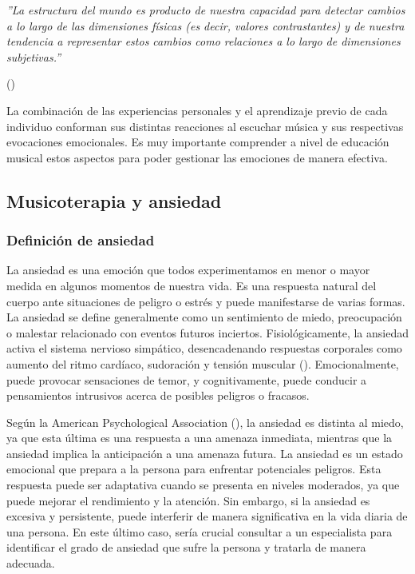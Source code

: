 \begin{itemize}
	\begin{adjustwidth}{100pt}{0pt}
		\textit{''La estructura del mundo es producto de nuestra capacidad para detectar cambios a lo largo de las dimensiones físicas (es decir, valores contrastantes) y de nuestra tendencia a representar estos cambios como relaciones a lo largo de dimensiones subjetivas.''}
		\begin{flushright}
			\vspace{-10px}
			(\cite{JONES:1976})
		\end{flushright}
	\end{adjustwidth}
\end{itemize}

La combinación de las experiencias personales y el aprendizaje previo de cada individuo conforman sus distintas reacciones al escuchar música y sus respectivas evocaciones emocionales. Es muy importante comprender a nivel de educación musical estos aspectos para poder gestionar las emociones de manera efectiva.

\subsection{Musicoterapia y ansiedad}

\subsubsection{Definición de ansiedad}

La ansiedad es una emoción que todos experimentamos en menor o mayor medida en algunos momentos de nuestra vida. Es una respuesta natural del cuerpo ante situaciones de peligro o estrés y puede manifestarse de varias formas. La ansiedad se define generalmente como un sentimiento de miedo, preocupación o malestar relacionado con eventos futuros inciertos. Fisiológicamente, la ansiedad activa el sistema nervioso simpático, desencadenando respuestas corporales como aumento del ritmo cardíaco, sudoración y tensión muscular (\cite{APA:2013}). Emocionalmente, puede provocar sensaciones de temor, y cognitivamente, puede conducir a pensamientos intrusivos acerca de posibles peligros o fracasos.

Según la American Psychological Association (\citeyear{APA:2020}), la ansiedad es distinta al miedo, ya que esta última es una respuesta a una amenaza inmediata, mientras que la ansiedad implica la anticipación a una amenaza futura. La ansiedad es un estado emocional que prepara a la persona para enfrentar potenciales peligros. Esta respuesta puede ser adaptativa cuando se presenta en niveles moderados, ya que puede mejorar el rendimiento y la atención. Sin embargo, si la ansiedad es excesiva y persistente, puede interferir de manera significativa en la vida diaria de una persona. En este último caso, sería crucial consultar a un especialista para identificar el grado de ansiedad que sufre la persona y tratarla de manera adecuada.

